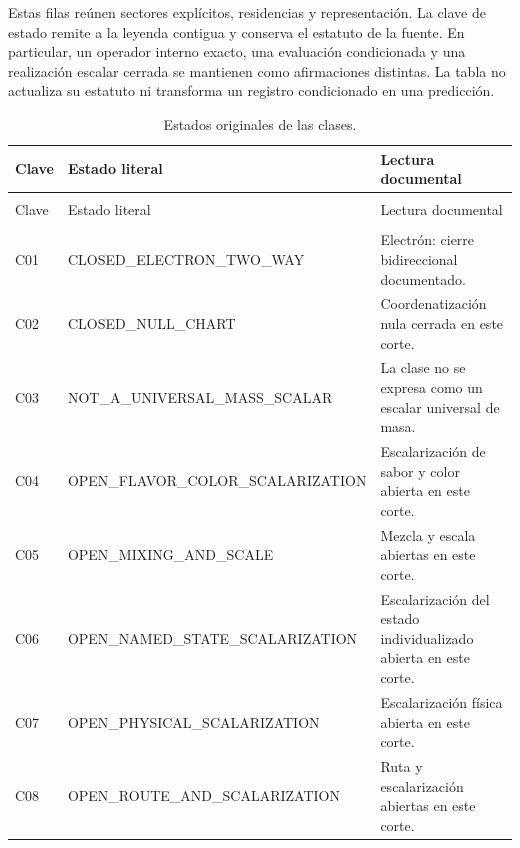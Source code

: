Estas filas reúnen sectores explícitos, residencias y representación. La clave
de estado remite a la leyenda contigua y conserva el estatuto de la fuente.
En particular, un operador interno exacto, una evaluación condicionada y una
realización escalar cerrada se mantienen como afirmaciones distintas. La tabla
no actualiza su estatuto ni transforma un registro condicionado en una predicción.

\begingroup
\setlength{\tabcolsep}{4pt}
\setlength{\extrarowheight}{4pt}
\renewcommand{\arraystretch}{1.13}
\begin{longtable}{@{}>{\raggedright\arraybackslash}p{}>{\raggedright\arraybackslash}p{}>{\raggedright\arraybackslash}p{}@{}}
\caption{Estados originales de las clases.}\label{tab:vi-estados-clases}\\
\toprule
Clave & Estado literal & Lectura documental \\
\midrule
\endfirsthead
\multicolumn{3}{l}{\textit{Continuación}}\\
\toprule
Clave & Estado literal & Lectura documental \\
\midrule
\endhead
\midrule
\multicolumn{3}{r}{Continúa en la página siguiente}\\
\endfoot
\bottomrule
\endlastfoot
C01 & CLOSED\_\allowbreak{}ELECTRON\_\allowbreak{}TWO\_\allowbreak{}WAY & Electrón: cierre bidireccional documentado. \\
C02 & CLOSED\_\allowbreak{}NULL\_\allowbreak{}CHART & Coordenatización nula cerrada en este corte. \\
C03 & NOT\_\allowbreak{}A\_\allowbreak{}UNIVERSAL\_\allowbreak{}MASS\_\allowbreak{}SCALAR & La clase no se expresa como un escalar universal de masa. \\
C04 & OPEN\_\allowbreak{}FLAVOR\_\allowbreak{}COLOR\_\allowbreak{}SCALARIZATION & Escalarización de sabor y color abierta en este corte. \\
C05 & OPEN\_\allowbreak{}MIXING\_\allowbreak{}AND\_\allowbreak{}SCALE & Mezcla y escala abiertas en este corte. \\
C06 & OPEN\_\allowbreak{}NAMED\_\allowbreak{}STATE\_\allowbreak{}SCALARIZATION & Escalarización del estado individualizado abierta en este corte. \\
C07 & OPEN\_\allowbreak{}PHYSICAL\_\allowbreak{}SCALARIZATION & Escalarización física abierta en este corte. \\
C08 & OPEN\_\allowbreak{}ROUTE\_\allowbreak{}AND\_\allowbreak{}SCALARIZATION & Ruta y escalarización abiertas en este corte. \\
\end{longtable}
\endgroup

